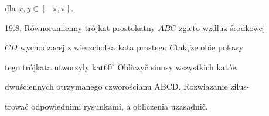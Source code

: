 \documentclass[a4paper,12pt]{article}
\begin{document}
dla $x, y\in[-\pi,\pi].$

19.8. Równoramienny trójkat prostokatny $ABC$ zgieto wzdluz środkowej

$CD$ wychodzacej $\mathrm{z}$ wierzcholka kata prostego $C\mathrm{t}\mathrm{a}\mathrm{k}, \dot{\mathrm{z}}\mathrm{e}$ obie polowy

tego trójkata utworzyly $\mathrm{k}\mathrm{a}\mathrm{t}60^{\circ}$ Obliczyč sinusy wszystkich katów

dwuściennych otrzymanego czworościanu ABCD. Rozwiazanie zilus-

trowač odpowiednimi rysunkami, a obliczenia uzasadnič.
\end{document}
